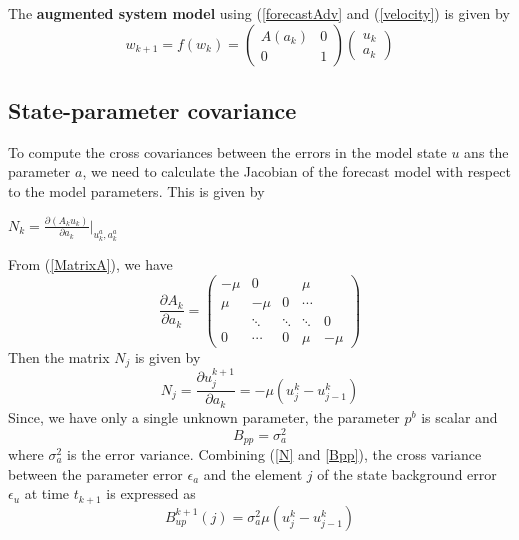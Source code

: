 \documentclass[a4,12pt]{article}
\numberwithin{equation}{section}
\begin{document}
The \textbf{augmented system model} using (\ref{forecastAdv} and (\ref{velocity}) is given by 
\begin{equation}
w_{k+1} = f(w_k) = 
\begin{pmatrix}
A(a_k) & 0\\
0 & 1
\end{pmatrix} 
\begin{pmatrix}
u_k\\
a_k
\end{pmatrix} 
\label{MatrixA}
\end{equation}

\subsection{State-parameter covariance}
To compute the cross covariances between the errors in the model state $u$ ans the parameter $a$, we need to calculate the Jacobian of the forecast model with respect to the model parameters. This is given by 
\begin{center}
    $N_k  = \frac{\partial (A_k u_k)}{\partial a_k} \big|_{u_k^a, a_k^a}$
\end{center}

From (\ref{MatrixA}), we have
\begin{equation}
\frac{\partial A_k}{\partial a_k} = 
\begin{pmatrix}
-\mu  & 0& & \mu\\
\mu  & -\mu & 0 & \cdots \\
 & \ddots &\ddots &\ddots&0\ \\
 0 & \cdots & 0 & \mu & -\mu 
\end{pmatrix} 
\end{equation}
Then the matrix $N_j$ is given by
\begin{equation}
    N_j = \frac{\partial u_j^{k+1}}{\partial a_k} = -\mu ( u_j^k - u_{j-1}^k)
\label{N}
\end{equation}
Since, we have only a single unknown parameter, the parameter $p^b$ is scalar and 
\begin{equation}
    B_{pp} = \sigma_a^2
\label{Bpp}
\end{equation}
where $\sigma_a^2$ is the error variance.
Combining (\ref{N} and \ref{Bpp}), the cross variance between the parameter error $\epsilon_a$ and the element $j$ of the state background error $\epsilon_u $ at time $t_{k+1}$ is expressed as
\begin{equation}
    B_{up}^{k+1}(j)  = \sigma_a^2  \mu ( u_j^k - u_{j-1}^k)
\end{equation}
\end{document}
